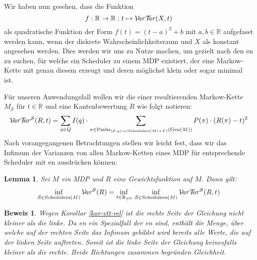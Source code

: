 \documentclass[a4paper]{article}
\newcommand{\mc}{Markow-Kette}
\newtheorem{lemma}[satz]{Lemma}
\theoremstyle{nonumberplain}
\newtheorem{beweis}{Beweis}
\begin{document}
	
	Wir haben nun gesehen, dass die Funktion
	\[
	f : \mathbb{R} \to \mathbb{R} : t \mapsto \mathcal{V}\!ar \mathcal{T}\!\!ar(X,t)
	\]
	als quadratische Funktion der Form $f(t) = (t-a)^2 + b$ mit $a,b \in \mathbb{R}$ aufgefasst werden kann, wenn der diskrete Wahrscheinlichkeitsraum und $X$ als konstant angesehen werden.  Dies werden wir uns zu Nutze machen, um gezielt nach den \expect{}en zu suchen, für welche ein Scheduler zu einem MDP existiert, der eine \mc{} mit genau diesem \expect{} erzeugt und deren \var{} möglichst klein oder sogar minimal ist.
	\begin{comment}
	Dabei ergibt sich $a = \mathcal{E}(X)$ und $b = \mvar(X)$:
	\begin{align*}
	& & f(t) & =  \sum_{\omega \in \Omega}{P(\omega) \cdot \left((X(\omega)-t)^2\right)} \\
	\implies & & f(t) & = \sum_{\omega \in \Omega}{P(\omega) \cdot \left(t^2 -2tX(\omega) + \left(\mathcal{E}(X)\right)^2 - \left(\mathcal{E}(X)\right)^2 + \left(X(\omega)\right)^2\right)} \\
	\implies & & f(t) & = \left(t - \mathcal{E}(X)\right)^2 - \left(\mathcal{E}(X)\right)^2 + \mathcal{E}(X^2) \\
	\implies & & f(t) & = \left(t - \mathcal{E}(X)\right)^2 + \mvar(X) \\
	\end{align*}
	\end{comment}
	
	Für unseren Anwendungsfall wollen wir die \vt{} einer resultierenden \mc{} $M_\mathcal{S}$ für $t \in \mathbb{R}$ und eine Kantenbewertung $R$ wie folgt notieren:
	\begin{equation}\label{eq-vts}
	\mathcal{V}\!ar \mathcal{T}\!\!ar^{\mathcal{S}}(R,t) = \sum_{q \in Q}{I(q)} \cdot \sum_{\pi \in \mathrm{Paths}_{({\mathcal{S}},q) \rightarrow (\mathrm{Schedulers}(M)\times T)}(\mathrm{Gen}(M))}{P(\pi) \cdot (R(\pi) - t)^2}
	\end{equation}
	Nach vorangegangenen Betrachtungen stellen wir leicht fest, dass wir das Infimum der Varianzen von allen \mc{}n eines MDP für entsprechende Scheduler mit \vt{}en ausdrücken können:
	\begin{lemma} Sei $M$ ein MDP und $R$ eine Gewichtsfunktion auf $M$. Dann gilt:
		\begin{equation}
		\inf_{\mathcal{S} \in \mathrm{Schedulers}(M)}{\mathcal{V}\!ar^{\mathcal{S}}(R)}
		=
		\inf_{t \in \mathbb{R}_{\geq 0}}{
			\:\inf_{\mathcal{S} \in \mathrm{Schedulers}(M)}{
				\mathcal{V}\!ar \mathcal{T}\!\!ar^{\mathcal{S}}(R,t)
			}
		}
		\end{equation}
	\end{lemma}
	\begin{beweis}
		Wegen Korollar \ref{kor-vtt-rel} ist die rechte Seite der Gleichung nicht kleiner als die linke. Da \var{}en ein Spezialfall der \vt{}en sind, enthält die Menge, über welche auf der rechten Seite das Infimum gebildet wird bereits alle Werte, die auf der linken Seite auftreten. Somit ist die linke Seite der Gleichung keinesfalls kleiner als die rechte. Beide Richtungen zusammen begründen Gleichheit.
	\end{beweis}
	
\end{document}
